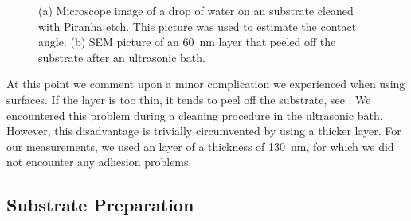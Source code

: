 	\begin{figure}[!bht]
		\begin{subfigure}[t]{ 0.49\linewidth}
			\caption{}\label{subfig::wetting}
			\centering
		\end{subfigure}
		\hfill
		\begin{subfigure}[t]{ 0.49\linewidth}
			\caption{}\label{subfig::peeled_ir}
			\centering
		\end{subfigure}
		\caption[Details for \ir substrates]{(a) Microscope image of a drop of water on an \ir substrate cleaned with Piranha etch. This picture was used to estimate the contact angle. (b) SEM picture of an \SI{60}{nm} \ir layer that peeled off the substrate after an ultrasonic bath.}
		\label{fig::sem_substrates}
	\end{figure}

	At this point we comment upon a minor complication we experienced when using \ir surfaces.
	If the \ir layer is too thin, it tends to peel off the substrate, see .
	We encountered this problem during a cleaning procedure in the ultrasonic bath.
	However, this disadvantage is trivially circumvented by using a thicker \ir layer.
	For our measurements, we used an \ir layer of a thickness of \SI{130}{nm}, for which we did not encounter any adhesion problems.

	\newpage
	\subsection{Substrate Preparation}

